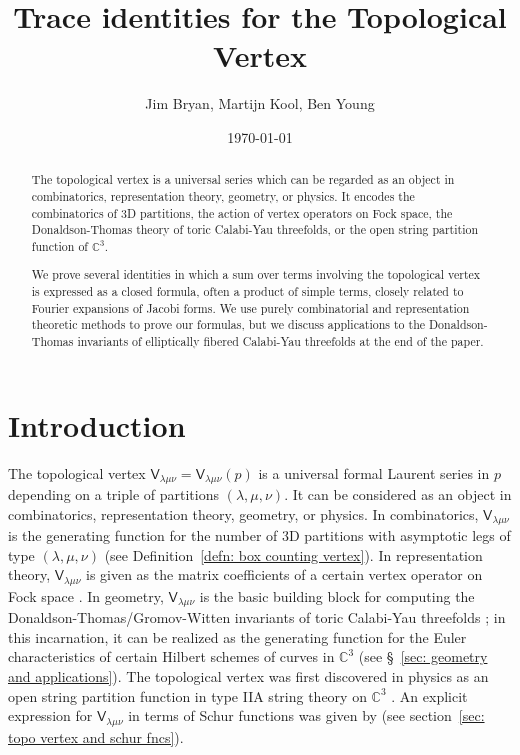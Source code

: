 \documentclass[12pt]{amsart}
\title{Trace identities for the Topological Vertex}
\author{Jim Bryan, Martijn Kool, Ben Young}
\date{\today}
\newcommand{\cnums} {{\mathbb C}}          %
\newcommand{\Vsf}{\mathsf{V}}
\theoremstyle{definition}
\begin{document}
\begin{abstract}
The topological vertex is a universal series which can be regarded as
an object in combinatorics, representation theory, geometry, or
physics. It encodes the combinatorics of 3D partitions, the action of
vertex operators on Fock space, the Donaldson-Thomas theory of toric
Calabi-Yau threefolds, or the open string partition function of
$\cnums^{3}$.

We prove several identities in which a sum over terms involving the
topological vertex is expressed as a closed formula, often a product
of simple terms, closely related to Fourier expansions of Jacobi
forms. We use purely combinatorial and representation theoretic
methods to prove our formulas, but we discuss applications to the
Donaldson-Thomas invariants of elliptically fibered Calabi-Yau
threefolds at the end of the paper. 
\end{abstract}

\maketitle 





\section{Introduction}\label{sec: intro}

The topological vertex $\Vsf_{\lambda \mu \nu}=\Vsf_{\lambda \mu
\nu}(p)$ is a universal formal Laurent series in $p$ depending on a
triple of partitions $(\lambda, \mu, \nu )$. It can be considered as
an object in combinatorics, representation theory, geometry, or
physics. In combinatorics, $\Vsf_{\lambda \mu \nu}$ is the generating
function for the number of 3D partitions with asymptotic legs of type
$(\lambda, \mu, \nu )$ (see Definition~\ref{defn: box counting
vertex}). In representation theory, $\Vsf_{\lambda \mu \nu}$ is given
as the matrix coefficients of a certain vertex operator on Fock space
\cite{Ok-Re-Va}. In geometry, $\Vsf_{\lambda \mu \nu}$ is the basic
building block for computing the Donaldson-Thomas/Gromov-Witten
invariants of toric Calabi-Yau threefolds \cite{MNOP1}; in this
incarnation, it can be realized as the generating function for the
Euler characteristics of certain Hilbert schemes of curves in
$\cnums^{3}$ (see \S~\ref{sec: geometry and applications}). The
topological vertex was first discovered in physics as an open string
partition function in type IIA string theory on $\cnums^{3}$
\cite{AKMV}. An explicit expression for $\Vsf_{\lambda \mu \nu}$ in
terms of Schur functions was given by \cite{Ok-Re-Va} (see
section~\ref{sec: topo vertex and schur fncs}).
\end{document}
